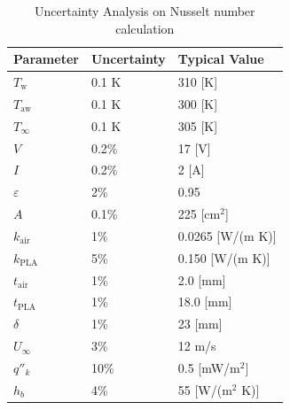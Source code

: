 \begin{table}
\centering
    \begin{tabular}{lll}
        \toprule
        Parameter               & Uncertainty   & Typical Value \\ \midrule
        $T_\mathrm{w}$                   & 0.1 K         & 310 [K]  \\
        $T_\mathrm{aw}$                & 0.1 K         & 300 [K] \\
        $T_\infty$              & 0.1 K         & 305 [K] \\
        $V$                     & 0.2\%         & 17 [V] \\
        $I$                     & 0.2\%         & 2 [A] \\
        $\varepsilon$           & 2\%           & 0.95 \\
        $A$                     & 0.1\%         & 225 [cm$^2$] \\
        $k_{{\mathrm{air}}}$    & 1\%           & 0.0265 [W/(m K)] \\
        $k_{{\mathrm{PLA}}}$    & 5\%            & 0.150 [W/(m K)] \\
        $t_{{\mathrm{air}}}$    & 1\%           & 2.0 [mm] \\
        $t_{{\mathrm{PLA}}}$    & 1\%           & 18.0 [mm] \\
        $\delta$                & 1\%           & 23 [mm] \\
        $U_\infty$              & 3\%           & 12 m/s \\
        $q''_k$                 & 10\%          & 0.5 [mW/m$^2$] \\ 
        $h_b$                   & 4\%           & 55 [W/(m$^2$ K)] \\ 
        \bottomrule
    \end{tabular}
    \caption{Uncertainty Analysis on Nusselt number calculation} \label{tab:uncertainties}
\end{table}

